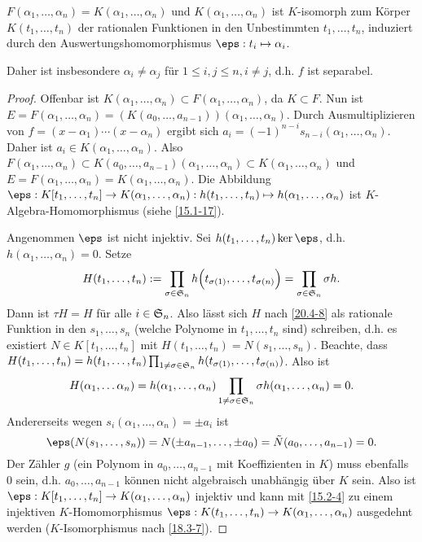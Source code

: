 \begin{lem} \label{20.4-9}
	$F(\alpha_1, \dotsc, \alpha_n) = K(\alpha_1, \dotsc, \alpha_n)$ und $K(\alpha_1, \dotsc, \alpha_n)$ ist $K$-isomorph zum Körper $K(t_1, \dotsc, t_n)$ der rationalen Funktionen in den Unbestimmten $t_1, \dotsc, t_n$, induziert durch den Auswertungshomomorphismus $\eps: t_i \mapsto \alpha_i$.
	\begin{note}
		Daher ist insbesondere $\alpha_i \neq \alpha_j$ für $1 \le i, j \le n, i \neq j$, d.h. $f$ ist separabel.
	\end{note}
	\begin{proof}
		Offenbar ist $K(\alpha_1, \dotsc, \alpha_n) \subset F(\alpha_1, \dotsc, \alpha_n)$, da $K \subset F$.
		Nun ist $E = F(\alpha_1, \dotsc, \alpha_n) = (K(a_0, \dotsc, a_{n-1}))(\alpha_1, \dotsc, \alpha_n)$.
		Durch Ausmultiplizieren von $f = (x-\alpha_1) \dotsb (x-\alpha_n)$ ergibt sich $a_i = (-1)^{n-i} s_{n-i}(\alpha_1, \dotsc, \alpha_n)$.
		Daher ist $a_i \in K(\alpha_1, \dotsc, \alpha_n)$.
		Also $F(\alpha_1, \dotsc, \alpha_n) \subset K(a_0, \dotsc, a_{n-1})(\alpha_1, \dotsc, \alpha_n) \subset K(\alpha_1, \dotsc, \alpha_n)$ und $E = F(\alpha_1, \dotsc, \alpha_n) = K(\alpha_1, \dotsc, \alpha_n)$.
		Die Abbildung $\eps: K[t_1, \dotsc, t_n] \to K(\alpha_1, \dotsc, \alpha_n): h(t_1, \dotsc, t_n) \mapsto h(\alpha_1, \dotsc, \alpha_n)$ ist $K$-Algebra-Homomorphismus (siehe \ref{15.1-17}).

		Angenommen $\eps$ ist nicht injektiv.
		Sei $h(t_1, \dotsc, t_n) \ker \eps$, d.h. $h(\alpha_1, \dotsc, \alpha_n) = 0$.
		Setze
		\[
			H(t_1, \dotsc, t_n)
			:= \prod_{\sigma \in \S_n} h\Big(t_{\sigma(1)}, \dotsc, t_{\sigma(n)} \Big)
			= \prod_{\sigma \in \S_n} \sigma h .
		\]
		Dann ist $\tau H = H$ für alle $i \in \S_n$.
		Also lässt sich $H$ nach \ref{20.4-8} als rationale Funktion in den $s_1, \dotsc, s_n$ (welche Polynome in $t_1, \dotsc, t_n$ sind) schreiben, d.h. es existiert $N \in K[t_1, \dotsc, t_n]$ mit $H(t_1, \dotsc, t_n) = N(s_1, \dotsc, s_n)$.
		Beachte, dass $H(t_1, \dotsc, t_n) = h(t_1, \dotsc, t_n) \prod_{1 \neq \sigma \in \S_n} h(t_{\sigma(1)}, \dotsc, t_{\sigma(n)})$.
		Also ist
		\[
			H(\alpha_1, \dotsc \alpha_n)
			= h(\alpha_1, \dotsc, \alpha_n) \prod_{1 \neq \sigma \in \S_n} \sigma h(\alpha_1, \dotsc, \alpha_n)
			= 0.
		\]
		Andererseits wegen $s_i(\alpha_1, \dotsc, \alpha_n) = \pm a_i$ ist
		\[
			\eps(N(s_1, \dotsc, s_n)) = N(\pm a_{n-1}, \dotsc, \pm a_0) = \tilde N(a_0, \dotsc, a_{n-1}) = 0.
		\]
		Der Zähler $g$ (ein Polynom in $a_0, \dotsc, a_{n-1}$ mit Koeffizienten in $K$) muss ebenfalls $0$ sein, d.h. $a_0, \dotsc, a_{n-1}$ können nicht algebraisch unabhängig über $K$ sein.
		Also ist $\eps: K[t_1, \dotsc, t_n] \to K(\alpha_1, \dotsc, \alpha_n)$ injektiv und kann mit \ref{15.2-4} zu einem injektiven $K$-Homomorphismus $\eps: K(t_1, \dotsc, t_n) \to K(\alpha_1, \dotsc, \alpha_n)$ ausgedehnt werden ($K$-Isomorphismus nach \ref{18.3-7}).
	\end{proof}
\end{lem}

